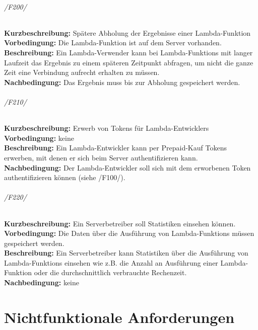 \documentclass[a4paper,20pt,oneside]{book}
\begin{document}
\subparagraph{/F200/}
\textbf{Kurzbeschreibung:} Spätere Abholung der Ergebnisse einer \Gls{Lambda-Funktion}
\\
\textbf{Vorbedingung:} Die \Gls{Lambda-Funktion} ist auf dem \Gls{Server} vorhanden.
\\
\textbf{Beschreibung:} Ein \Gls{Lambda-Verwender} kann bei \Glspl{Lambda-Funktion} mit langer Laufzeit das Ergebnis zu einem späteren Zeitpunkt abfragen, um nicht die ganze Zeit eine Verbindung aufrecht erhalten zu müssen.
\\
\textbf{Nachbedingung:} Das Ergebnis muss bis zur Abholung gespeichert werden.

\subparagraph{/F210/}
\textbf{Kurzbeschreibung:} Erwerb von \Glspl{Token} für \Glspl{Lambda-Entwickler}
\\
\textbf{Vorbedingung:} keine
\\
\textbf{Beschreibung:} Ein \Gls{Lambda-Entwickler} kann per Prepaid-Kauf \Glspl{Token} erwerben, mit denen er sich beim \Gls{Server} authentifizieren kann.
\\
\textbf{Nachbedingung:} Der \Gls{Lambda-Entwickler} soll sich mit dem erworbenen \Gls{Token} authentifizieren können (siehe /F100/).

\subparagraph{/F220/}
\textbf{Kurzbeschreibung:} Ein \Gls{Serverbetreiber} soll Statistiken einsehen können.
\\
\textbf{Vorbedingung:} Die Daten über die Ausführung von \Glspl{Lambda-Funktion} müssen gespeichert werden.
\\
\textbf{Beschreibung:} Ein \Gls{Serverbetreiber} kann Statistiken über die Ausführung von \Glspl{Lambda-Funktion} einsehen wie z.B. die Anzahl an Ausführung einer \gls{Lambda-Funktion} oder die durchschnittlich verbrauchte \Gls{Rechenzeit}.
\\
\textbf{Nachbedingung:} keine
\fi

\chapter{Nichtfunktionale Anforderungen}
\end{document}
